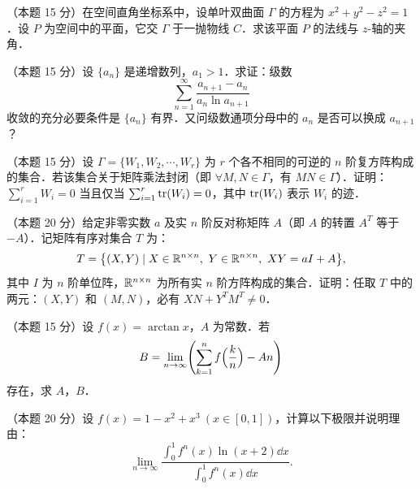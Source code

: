 
\begin{problems}

\item[一、]（本题 15 分）在空间直角坐标系中，设单叶双曲面 $\Gamma$ 的方程为 $x^2+y^2-z^2=1$．设 $P$ 为空间中的平面，它交 $\Gamma$ 于一抛物线 $C$．求该平面 $P$ 的法线与 $z$-轴的夹角．

\item[二、]（本题 15 分）设 $\{a_n\}$ 是递增数列，$a_1>1$．求证：级数
\[
  \sum_{n=1}^{\infty}\frac{a_{n+1}-a_n}{a_n\ln a_{n+1}}
\]
收敛的充分必要条件是 $\{a_n\}$ 有界．又问级数通项分母中的 $a_n$ 是否可以换成 $a_{n+1}$？

\item[三、]（本题 15 分）设 $\Gamma=\{W_1,W_2,\cdots,W_r\}$ 为 $r$ 个各不相同的可逆的 $n$ 阶复方阵构成的集合．若该集合关于矩阵乘法封闭（即 $\forall M,N\in\Gamma$，有 $MN\in\Gamma$）．证明：$\sum_{i=1}^{r}W_i=0$ 当且仅当 $\sum_{i=1}^{r}\operatorname{tr}(W_i)=0$，其中 $\operatorname{tr}(W_i)$ 表示 $W_i$ 的迹．

\item[四、]（本题 20 分）给定非零实数 $a$ 及实 $n$ 阶反对称矩阵 $A$（即 $A$ 的转置 $A^T$ 等于 $-A$）．记矩阵有序对集合 $T$ 为：
\[
  T=\bigl\{(X,Y)\mid X\in\mathbb{R}^{n\times n},\ Y\in\mathbb{R}^{n\times n},\ XY=aI+A\bigr\},
\]
其中 $I$ 为 $n$ 阶单位阵，$\mathbb{R}^{n\times n}$ 为所有实 $n$ 阶方阵构成的集合．证明：任取 $T$ 中的两元：$(X,Y)$ 和 $(M,N)$，必有 $XN+Y^TM^T\ne 0$．

\item[五、]（本题 15 分）设 $f(x)=\arctan x$，$A$ 为常数．若
\[
  B=\lim_{n\to\infty}\Biggl(\sum_{k=1}^{n}f\Bigl(\frac{k}{n}\Bigr)-An\Biggr)
\]
存在，求 $A$，$B$．

\item[六、]（本题 20 分）设 $f(x)=1-x^2+x^3\ (x\in[0,1])$，计算以下极限并说明理由：
\[
  \lim_{n\to\infty}\frac{\displaystyle\int_0^1 f^n(x)\ln(x+2)\dd x}{\displaystyle\int_0^1 f^n(x)\dd x}.
\]

\end{problems}
